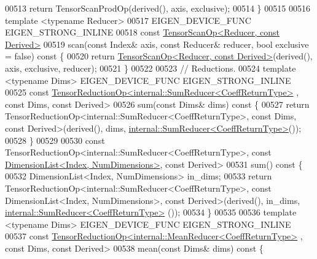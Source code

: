 \begin{DoxyCode}
00513       \textcolor{keywordflow}{return} TensorScanProdOp(derived(), axis, exclusive);
00514     \}
00515 
00516     \textcolor{keyword}{template} <\textcolor{keyword}{typename} Reducer>
00517     EIGEN\_DEVICE\_FUNC EIGEN\_STRONG\_INLINE
00518     \textcolor{keyword}{const} \hyperlink{class_eigen_1_1_tensor_scan_op}{TensorScanOp<Reducer, const Derived>}
00519     scan(\textcolor{keyword}{const} Index& axis, \textcolor{keyword}{const} Reducer& reducer, \textcolor{keywordtype}{bool} exclusive = \textcolor{keyword}{false})\textcolor{keyword}{ const }\{
00520       \textcolor{keywordflow}{return} \hyperlink{class_eigen_1_1_tensor_scan_op}{TensorScanOp<Reducer, const Derived>}(derived(), axis, 
      exclusive, reducer);
00521     \}
00522 
00523     \textcolor{comment}{// Reductions.}
00524     \textcolor{keyword}{template} <\textcolor{keyword}{typename} Dims> EIGEN\_DEVICE\_FUNC EIGEN\_STRONG\_INLINE
00525     \textcolor{keyword}{const} \hyperlink{class_eigen_1_1_tensor_reduction_op}{TensorReductionOp<internal::SumReducer<CoeffReturnType>}
      , \textcolor{keyword}{const} Dims, \textcolor{keyword}{const} Derived>
00526     sum(\textcolor{keyword}{const} Dims& dims)\textcolor{keyword}{ const }\{
00527       \textcolor{keywordflow}{return} TensorReductionOp<internal::SumReducer<CoeffReturnType>, \textcolor{keyword}{const} Dims, \textcolor{keyword}{const} Derived>(derived(),
       dims, \hyperlink{struct_eigen_1_1internal_1_1_sum_reducer}{internal::SumReducer<CoeffReturnType>}());
00528     \}
00529 
00530     \textcolor{keyword}{const} TensorReductionOp<internal::SumReducer<CoeffReturnType>, \textcolor{keyword}{const} 
      \hyperlink{struct_eigen_1_1_dimension_list}{DimensionList<Index, NumDimensions>}, \textcolor{keyword}{const} Derived>
00531     sum()\textcolor{keyword}{ const }\{
00532       DimensionList<Index, NumDimensions> in\_dims;
00533       \textcolor{keywordflow}{return} TensorReductionOp<internal::SumReducer<CoeffReturnType>, \textcolor{keyword}{const} DimensionList<Index,
       NumDimensions>, \textcolor{keyword}{const} Derived>(derived(), in\_dims, \hyperlink{struct_eigen_1_1internal_1_1_sum_reducer}{internal::SumReducer<CoeffReturnType>}
      ());
00534     \}
00535 
00536     \textcolor{keyword}{template} <\textcolor{keyword}{typename} Dims> EIGEN\_DEVICE\_FUNC EIGEN\_STRONG\_INLINE
00537     \textcolor{keyword}{const} \hyperlink{class_eigen_1_1_tensor_reduction_op}{TensorReductionOp<internal::MeanReducer<CoeffReturnType>}
      , \textcolor{keyword}{const} Dims, \textcolor{keyword}{const} Derived>
00538     mean(\textcolor{keyword}{const} Dims& dims)\textcolor{keyword}{ const }\{

\end{DoxyCode}
